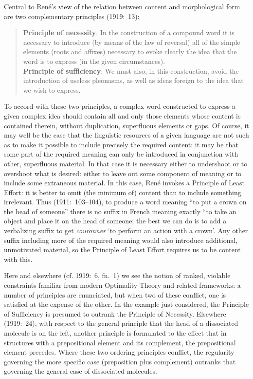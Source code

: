 \documentclass[output=paper]{langsci/langscibook}
\begin{document}
Central to René's view of the relation between content and
morphological form are two complementary principles (1919:~13):
\begin{quotation}
  \textbf{Principle of necessity}. In the construction of a compound
  word it is necessary to introduce (by means of the law of reversal)
  all of the simple elements (roots and affixes) necessary to evoke
  clearly the idea that the word is to express (in the given
  circumstances).\medskip\\
  \noindent\textbf{Principle of sufficiency}: We must also, in this
  construction, avoid the introduction of useless pleonasms, as well
  as ideas foreign to the idea that we wish to express.
\end{quotation}

To accord with these two principles, a complex word constructed to
express a given complex idea should contain all and only those
elements whose content is contained therein, without duplication,
superfluous elements or gaps. Of course, it may well be the case that
the linguistic resources of a given language are not such as to make
it possible to include precisely the required content: it may be that
some part of the required meaning can only be introduced in
conjunction with other, superfluous material. In that case it is
necessary either to undershoot or to overshoot what is desired: either
to leave out some component of meaning or to include some extraneous
material.  In this case, René invokes a Principle of Least Effort: it
is better to omit (the minimum of) content than to include something
irrelevant. Thus (1911:~103--104), to produce a word meaning ``to
put a crown on the head of someone'' there is no suffix in French
meaning exactly ``to take an object and place it on the head of
someone; the best we can do is to add a verbalizing suffix to get
\emph{couronner} `to perform an action with a crown'.  Any other
suffix including more of the required meaning would also introduce
additional, unmotivated material, so the Principle of Least Effort
requires us to be content with this.

Here and elsewhere (cf. 1919:~6, fn.~1) we see the notion of ranked,
violable constraints familiar from modern Optimality Theory
\citep{prince:smolensky04:ot} and related frameworks: a number of
principles are enunciated, but when two of these conflict, one is
satisfied at the expense of the other.  In the example just
considered, the Principle of Sufficiency is presumed to outrank the
Principle of Necessity. Elsewhere (1919:~24), with respect to the general
principle that the head of a dissociated molecule is on the left,
another principle is formulated to the effect that in structures with
a prepositional element and its complement, the prepositional element
precedes.  Where these two ordering principles conflict, the
regularity governing the more specific case (preposition plus
complement) outranks that governing the general case of dissociated
molecules. 
\end{document}
